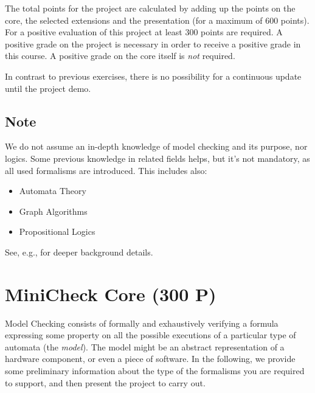 \documentclass{article}
\begin{document}
The total points for the project are calculated by adding up the points on the core, 
the selected extensions and the presentation (for a maximum of 600 points).
For a positive evaluation of this project at least 300 points are required. 
A positive grade on the project is necessary in order to receive a positive grade in this course.
A positive grade on the core itself is \textit{not} required. 

In contrast to previous exercises, there is no possibility for a continuous update until the project demo.

\subsection{Note}
We do not assume an in-depth knowledge of model checking and its purpose, nor logics.
Some previous knowledge in related fields helps, but it's not mandatory,
as all used formalisms are introduced. 
This includes also:
\begin{itemize}
    \item Automata Theory
    \item Graph Algorithms
    \item Propositional Logics
\end{itemize}
See, e.g., \cite{BaKa} for deeper background details.

\section{MiniCheck Core (300 P)}

Model Checking consists of formally and exhaustively verifying a formula expressing some property
on all the possible executions of a particular type of automata (the \emph{model}). 
The model might be an abstract representation of a hardware component, or even a 
piece of software.
In the following, we provide some preliminary information 
about the type of the formalisms you are required to support, 
and then present the project to carry out. 
\end{document}
